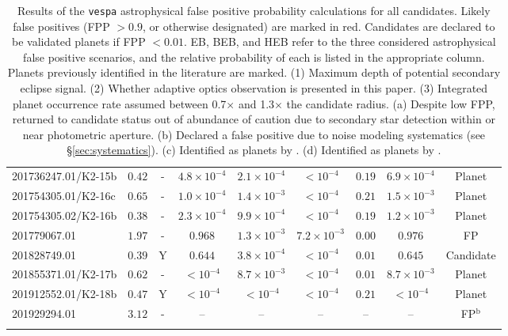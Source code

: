 \begin{landscape}
{\begin{longtable}{lcccccccc}
201736247.01/K2-15b & $0.42$ &  - & $4.8\times10^{-4}$ & $2.1\times10^{-4}$ & $< 10^{-4}$ & $0.19$ & $6.9\times10^{-4}$ & Planet  \\
201754305.01/K2-16c & $0.65$ &  - & $1.0\times10^{-4}$ & $1.4\times10^{-3}$ & $< 10^{-4}$ & $0.21$ & $1.5\times10^{-3}$ & Planet  \\
201754305.02/K2-16b & $0.38$ &  - & $2.3\times10^{-4}$ & $9.9\times10^{-4}$ & $< 10^{-4}$ & $0.19$ & $1.2\times10^{-3}$ & Planet  \\
 \color{red} 201779067.01  & \color{red}  $1.97$  & \color{red}   -  & \color{red}  $0.968$  & \color{red}  $1.3\times10^{-3}$  & \color{red}  $7.2\times10^{-3}$  & \color{red}  $0.00$  & \color{red}  $0.976$  & \color{red}  FP \\
201828749.01 & $0.39$ &  Y & $0.644$ & $3.8\times10^{-4}$ & $< 10^{-4}$ & $0.01$ & $0.645$ & Candidate  \\
201855371.01/K2-17b & $0.62$ &  - & $< 10^{-4}$ & $8.7\times10^{-3}$ & $< 10^{-4}$ & $0.01$ & $8.7\times10^{-3}$ & Planet  \\
201912552.01/K2-18b & $0.47$ &  Y & $< 10^{-4}$ & $< 10^{-4}$ & $< 10^{-4}$ & $0.21$ & $< 10^{-4}$ & Planet  \\
 \color{red} 201929294.01  & \color{red}  $3.12$  & \color{red}   -  & \color{red}   --  & \color{red}   --  & \color{red}   --  & \color{red}   --  & \color{red}  --  & \color{red}  FP$^{\textrm{b}}$ \\
\hline
\caption[False positive probability calculation results]{
Results of the \texttt{vespa} astrophysical 
false positive probability calculations for all candidates.  
Likely false positives (FPP $> 0.9$, or otherwise designated)
 are marked in red.  
Candidates are declared to be validated planets if FPP $< 0.01$.  
EB, BEB, and HEB refer to the three considered astrophysical 
false positive scenarios, and the relative probability of 
each is listed in the appropriate column.  Planets previously 
identified in the literature are marked. \\
(1) Maximum depth of potential secondary eclipse signal. \\
(2) Whether adaptive optics observation is presented in this paper. \\
(3) Integrated planet occurrence rate assumed between 0.7$\times$ and 1.3$\times$ the candidate radius. \\
(a) Despite low FPP, returned to candidate status 
out of abundance of caution due to secondary star detection within or near photometric aperture. \\
(b) Declared a false positive due to noise modeling systematics (see \S\ref{sec:systematics}). \\
(c) Identified as planets by \citet{Crossfield15}. \\
(d) Identified as planets by \citet{Armstrong15b}.}
\label{Table:FPP}
\end{longtable}
}
\end{landscape}

